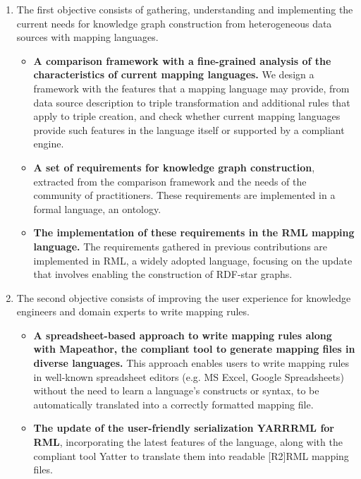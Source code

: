 \begin{enumerate}
    \item The first objective consists of gathering, understanding and implementing the current needs for knowledge graph construction from heterogeneous data sources with mapping languages. 

    \begin{itemize}
        \item \textbf{A comparison framework with a fine-grained analysis of the characteristics of current mapping languages.} We design a framework with the features that a mapping language may provide, from data source description to triple transformation and additional rules that apply to triple creation, and check whether current mapping languages provide such features in the language itself or supported by a compliant engine. 

        \item \textbf{A set of requirements for knowledge graph construction}, extracted from the comparison framework and the needs of the community of practitioners. These requirements are implemented in a formal language, an ontology. 

        \item \textbf{The implementation of these requirements in the RML mapping language.} The requirements gathered in previous contributions are implemented in RML, a widely adopted language, focusing on the update that involves enabling the construction of RDF-star graphs.
    \end{itemize}

    \item The second objective consists of improving the user experience for knowledge engineers and domain experts to write mapping rules.

    \begin{itemize}
        \item \textbf{A spreadsheet-based approach to write mapping rules along with Mapeathor, the compliant tool to generate mapping files in diverse languages.} This approach enables users to write mapping rules in well-known spreadsheet editors (e.g. MS Excel, Google Spreadsheets) without the need to learn a language's constructs or syntax, to be automatically translated into a correctly formatted mapping file. 

        \item \textbf{The update of the user-friendly serialization YARRRML for RML}, incorporating the latest features of the language, along with the compliant tool Yatter to translate them into readable [R2]RML mapping files. 
    \end{itemize}


\end{enumerate}
